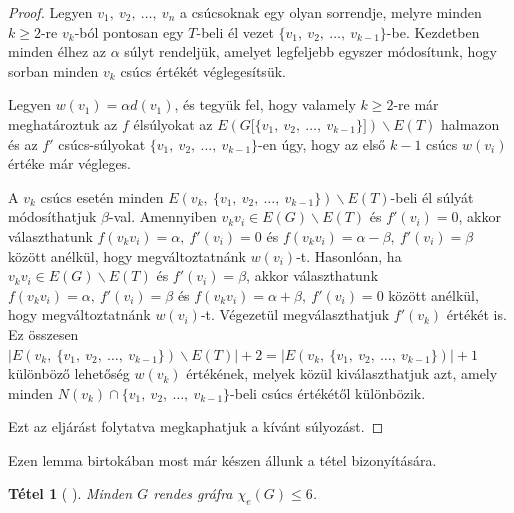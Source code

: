 \documentclass[12pt, a4paper]{report}
\newtheorem{tét}{Tétel}[section]
\theoremstyle{remark}
\theoremstyle{definition}
\begin{document}
\begin{proof}
Legyen $v_1,\ v_2,\ \ldots,\ v_n$ a csúcsoknak egy olyan sorrendje, melyre minden $k \geq 2$-re $v_k$-ból pontosan egy $T$-beli él vezet $\lbrace v_1,\ v_2,\ \ldots,\ v_{k - 1} \rbrace$-be. Kezdetben minden élhez az $\alpha$ súlyt rendeljük, amelyet legfeljebb egyszer módosítunk, hogy sorban minden $v_k$ csúcs értékét véglegesítsük.

Legyen $w(v_1) = \alpha d(v_1)$, és tegyük fel, hogy valamely $k \geq 2$-re már meghatároztuk az $f$ élsúlyokat az $E(G\lbrack \lbrace v_1,\ v_2,\ \ldots,\ v_{k - 1} \rbrace \rbrack) \smallsetminus E(T)$ halmazon és az $f'$ csúcs-súlyokat $\lbrace v_1,\ v_2,\ \ldots,\ v_{k - 1} \rbrace$-en úgy, hogy az első $k - 1$ csúcs $w(v_i)$ értéke már végleges.

A $v_k$ csúcs esetén minden $E(v_k,\ \lbrace v_1,\ v_2,\ \ldots,\ v_{k - 1} \rbrace) \smallsetminus E(T)$-beli él súlyát módosíthatjuk $\beta$-val. Amennyiben $v_k v_i \in E(G) \smallsetminus E(T)$ és $f'(v_i) = 0$, akkor választhatunk $f(v_k v_i) = \alpha,\ f'(v_i) = 0$ és $f(v_k v_i) = \alpha - \beta,\ f'(v_i) = \beta$ között anélkül, hogy megváltoztatnánk $w(v_i)$-t. Hasonlóan, ha $v_k v_i \in E(G) \smallsetminus E(T)$ és $f'(v_i) = \beta$, akkor választhatunk $f(v_k v_i) = \alpha,\ f'(v_i) = \beta$ és $f(v_k v_i) = \alpha + \beta,\ f'(v_i) = 0$ között anélkül, hogy megváltoztatnánk $w(v_i)$-t. Végezetül megválaszthatjuk $f'(v_k)$ értékét is. Ez összesen $|E(v_k,\ \lbrace v_1,\ v_2,\ \ldots,\ v_{k - 1} \rbrace) \smallsetminus E(T)| + 2 = |E(v_k,\ \lbrace v_1,\ v_2,\ \ldots,\ v_{k - 1} \rbrace)| + 1$ különböző lehetőség $w(v_k)$ értékének, melyek közül kiválaszthatjuk azt, amely minden $N(v_k) \cap \lbrace v_1,\ v_2,\ \ldots,\ v_{k - 1} \rbrace$-beli csúcs értékétől különbözik.

Ezt az eljárást folytatva megkaphatjuk a kívánt súlyozást.
\end{proof}

Ezen lemma birtokában most már készen állunk a tétel bizonyítására.

\begin{tét}[\citeauthor{Kalkowski2009} \cite{Kalkowski2009}]
Minden $G$ rendes gráfra $\chi_e(G) \leq 6$.
\end{tét}
\end{document}
